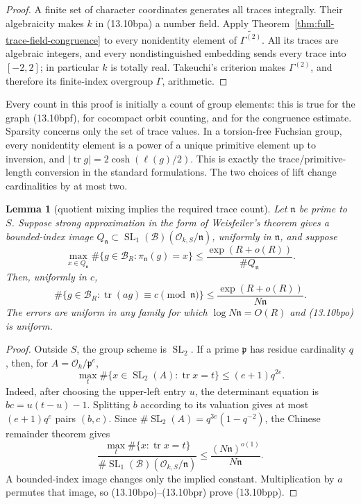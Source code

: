 \documentclass[11pt,reqno]{amsart}
\newtheorem{lemma}[theorem]{Lemma}
\theoremstyle{definition}
\theoremstyle{remark}
\newcommand{\cO}{\mathcal O}
\newcommand{\Tr}{\operatorname{tr}}
\newcommand{\SL}{\operatorname{SL}}
\begin{document}
\begin{proof}
A finite set of character coordinates generates all traces integrally.
Their algebraicity makes \(k\) in (13.10bpa) a number field.  Apply
Theorem~\ref{thm:full-trace-field-congruence} to every nonidentity element
of \(\widetilde{\Gamma^{(2)}}\).  All its traces are algebraic integers, and
every nondistinguished embedding sends every trace into \([-2,2]\); in
particular \(k\) is totally real.  Takeuchi's criterion \cite{Takeuchi} makes
\(\Gamma^{(2)}\), and therefore its finite-index overgroup \(\Gamma\),
arithmetic.
\end{proof}

Every count in this proof is initially a count of group elements: this is
true for the graph (13.10bpf), for cocompact orbit counting, and for the
congruence estimate.  Sparsity concerns only the set of trace values.  In a
torsion-free Fuchsian group, every
nonidentity element is a power of a unique primitive element up to inversion,
and \(|\Tr g|=2\cosh(\ell(g)/2)\).  This is exactly the trace/primitive-length
conversion in the standard formulations.  The two choices of lift change
cardinalities by at most two.

\begin{lemma}[quotient mixing implies the required trace count]
\label{lem:quotient-mixing-trace-count}
Let \(\mathfrak n\) be prime to \(S\).  Suppose strong approximation in the
form of Weisfeiler's theorem \cite{WeisfeilerStrong} gives
a bounded-index image
\(Q_{\mathfrak n}\subset
\SL_1(\mathcal B)(\cO_{k,S}/\mathfrak n)\), uniformly in
\(\mathfrak n\), and suppose
\[
 \max_{x\in Q_{\mathfrak n}}
 \#\{g\in\mathcal B_R:\pi_{\mathfrak n}(g)=x\}
 \le \frac{\exp(R+o(R))}{\#Q_{\mathfrak n}}.
\tag{13.10bpo}
\]
Then, uniformly in \(c\),
\[
 \#\{g\in\mathcal B_R:
       \Tr(ag)\equiv c\pmod{\mathfrak n}\}
 \le \frac{\exp(R+o(R))}{N\mathfrak n}.
\tag{13.10bpp}
\]
The errors are uniform in any family for which
\(\log N\mathfrak n=O(R)\) and (13.10bpo) is uniform.
\end{lemma}

\begin{proof}
Outside \(S\), the group scheme is \(\SL_2\).  If a prime
\(\mathfrak p\) has residue cardinality \(q\), then, for
\(A=\cO_k/\mathfrak p^e\),
\[
 \max_t\#\{x\in\SL_2(A):\Tr x=t\}\le(e+1)q^{2e}.
\tag{13.10bpq}
\]
Indeed, after choosing the upper-left entry \(u\), the determinant equation
is \(bc=u(t-u)-1\).  Splitting \(b\) according to its valuation gives at
most \((e+1)q^e\) pairs \((b,c)\).  Since
\(\#\SL_2(A)=q^{3e}(1-q^{-2})\), the Chinese remainder theorem gives
\[
 \frac{\max_t\#\{x:\Tr x=t\}}
      {\#\SL_1(\mathcal B)(\cO_{k,S}/\mathfrak n)}
 \le \frac{(N\mathfrak n)^{o(1)}}{N\mathfrak n}.
\tag{13.10bpr}
\]
A bounded-index image changes only the implied constant.  Multiplication by
\(a\) permutes that image, so (13.10bpo)--(13.10bpr) prove (13.10bpp).
\end{proof}
\end{document}

